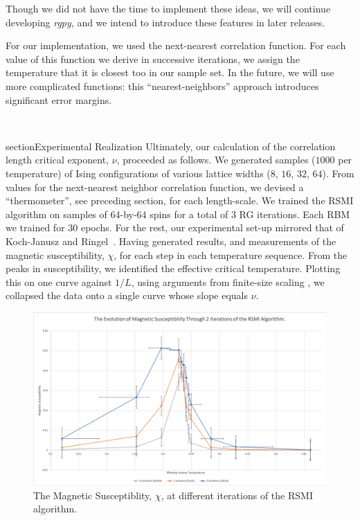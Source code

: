 Though we did not have the time to implement these ideas, we will
continue developing \textit{rgpy}, and we intend to introduce these
features in later releases.

For our implementation, we used the next-nearest correlation function.
For each value of this function we derive in successive iterations, we
assign the temperature that it is closest too in our sample set. In the future,
we will use more complicated functions: this ``nearest-neighbors'' approach
introduces significant error margins.

\
\item section{Experimental Realization}\label{sec:methods}
Ultimately, our calculation of the correlation length critical
exponent, $\nu$, proceeded as follows. We generated samples ($1000$
per temperature) of Ising configurations of various lattice widths
($8$, $16$, $32$, $64$). From values for the next-nearest neighbor
correlation function, we devised a ``thermometer'', see preceding
section, for each length-scale. We trained the RSMI algorithm on
samples of 64-by-64 spins for a total of 3 RG iterations. Each RBM we
trained for 30 epochs. For the rest, our experimental set-up mirrored
that of Koch-Janusz and Ringel~\cite{kjr}. Having generated results,
and measurements of the magnetic susceptibility, $\chi$, for each step
in each temperature sequence.  From the peaks in susceptibility, we
identified the effective critical temperature.  Plotting this on one
curve against $1 / L$, using arguments from finite-size scaling , we
collapsed the data onto a single curve whose slope equals $\nu$.
%
\begin{figure}[ht]
  \centering
  \includegraphics[width=\textwidth]{figures/susceptibility.png}
  \caption{The Magnetic Susceptiblity, $\chi$, at different iterations
    of the RSMI algorithm\label{fig:susceptibility}.}
\end{figure}
